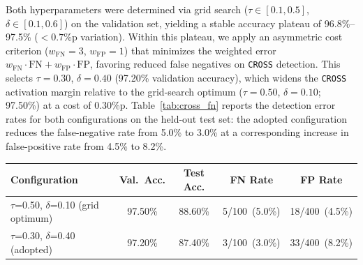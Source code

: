 \documentclass[a4paper,fleql]{cas-sc}
\begin{document}
Both hyperparameters were determined via grid search
($\tau \in [0.1, 0.5]$, $\delta \in [0.1, 0.6]$) on the validation set,
yielding a stable accuracy plateau of 96.8\%--97.5\% ($<0.7$\%p variation).
Within this plateau, we apply an asymmetric cost criterion
($w_{\text{FN}}=3$, $w_{\text{FP}}=1$) that minimizes the weighted error
$w_{\text{FN}} \cdot \text{FN} + w_{\text{FP}} \cdot \text{FP}$, favoring
reduced false negatives on \texttt{CROSS} detection. This selects
$\tau = 0.30$, $\delta = 0.40$ (97.20\% validation accuracy), which widens
the \texttt{CROSS} activation margin relative to the grid-search optimum
($\tau = 0.50$, $\delta = 0.10$; 97.50\%) at a cost of 0.30\%p.
Table~\ref{tab:cross_fn} reports the detection error rates for both
configurations on the held-out test set: the adopted configuration reduces
the false-negative rate from 5.0\% to 3.0\% at a corresponding increase in
false-positive rate from 4.5\% to 8.2\%.

\vspace{6pt plus 4pt minus 3pt}
\begin{center}
\begingroup
{}
\label{tab:cross_fn}
\begin{tabular}{lcccc}
\toprule
\textbf{Configuration} & \textbf{Val.\ Acc.} & \textbf{Test Acc.} & \textbf{FN Rate} & \textbf{FP Rate} \\
\midrule
$\tau$=0.50, $\delta$=0.10 (grid optimum) & 97.50\% & 88.60\% & 5/100\ (5.0\%) & 18/400\ (4.5\%) \\
$\tau$=0.30, $\delta$=0.40 (adopted)      & 97.20\% & 87.40\% & 3/100\ (3.0\%) & 33/400\ (8.2\%) \\
\bottomrule
\end{tabular}
\endgroup
\end{center}
\vspace{6pt plus 4pt minus 3pt}
\end{document}
